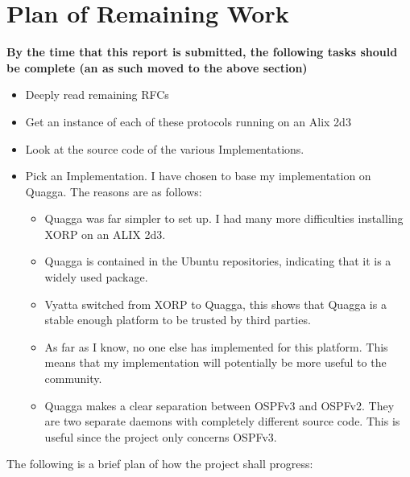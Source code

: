 \documentclass[12pt]{report}
\begin{document}
\chapter{Plan of Remaining Work}

\em

\textbf{
	By the time that this report is submitted, the following tasks should be
	complete (an as such moved to the above section) 
}

\begin{itemize}

\item Deeply read remaining RFCs
\item Get an instance of each of these protocols running on an Alix 2d3
\item Look at the source code of the various Implementations. 
\item Pick an Implementation. I have chosen to base my implementation on Quagga.
The reasons are as follows: 

\begin{itemize}
\item Quagga was far simpler to set up. I had many more difficulties installing
XORP on an ALIX 2d3.
\item Quagga is contained in the Ubuntu repositories, indicating that it is a
widely used package. 
\item Vyatta switched from XORP to Quagga, this shows that Quagga is a stable
enough platform to be trusted by third parties. 
\item As far as I know, no one else has implemented for this platform. This means
that my implementation will potentially be more useful to the community. 
\item Quagga makes a clear separation between OSPFv3 and OSPFv2. They are two
separate daemons with completely different source code. This is useful since the
project only concerns OSPFv3.
\end{itemize}


\end{itemize}

\em 

The following is a brief plan of how the project shall progress:
\end{document}
